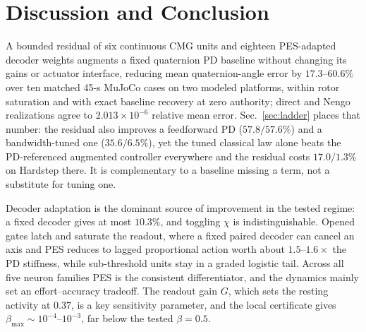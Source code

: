 \documentclass[letterpaper, 10 pt, conference]{ieeeconf}
\begin{document}

\section{Discussion and Conclusion}
\label{sec:conclusion}
A bounded residual of six continuous CMG units and eighteen PES-adapted decoder weights augments a fixed quaternion PD baseline without changing its gains or actuator interface, reducing mean quaternion-angle error by $17.3$--$60.6\%$ over ten matched 45-s MuJoCo cases on two modeled platforms, within rotor saturation and with exact baseline recovery at zero authority; direct and Nengo realizations agree to $2.013\times10^{-6}$ relative mean error. Sec.~\ref{sec:ladder} places that number: the residual also improves a feedforward PD ($57.8/57.6\%$) and a bandwidth-tuned one ($35.6/6.5\%$), yet the tuned classical law alone beats the PD-referenced augmented controller everywhere and the residual costs $17.0/1.3\%$ on Hardstep there. It is complementary to a baseline missing a term, not a substitute for tuning one.

Decoder adaptation is the dominant source of improvement in the tested regime: a fixed decoder gives at most $10.3\%$, and toggling $\chi$ is indistinguishable. Opened gates latch and saturate the readout, where a fixed paired decoder can cancel an axis and PES reduces to lagged proportional action worth about $1.5$--$1.6\times$ the PD stiffness, while sub-threshold units stay in a graded logistic tail. Across all five neuron families PES is the consistent differentiator, and the dynamics mainly set an effort--accuracy tradeoff. The readout gain $G$, which sets the resting activity at $0.37$, is a key sensitivity parameter, and the local certificate gives $\beta_{\max}\sim10^{-4}$--$10^{-3}$, far below the tested $\beta=0.5$.
\end{document}
